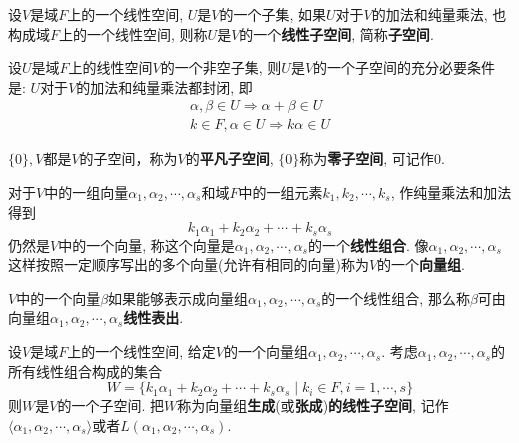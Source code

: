 \begin{Definition}[线性子空间]
设$V$是域$F$上的一个线性空间, $U$是$V$的一个\;\;子集, 如果$U$对于$V$的加法和纯量乘法, 也构成域$F$上的一个线性空间, 则称$U$是$V$的一个\textbf{线性子空间}, 简称\textbf{子空间}.
\end{Definition}

\begin{Theorem}[!!!]
设$U$是域$F$上的线性空间$V$的一个非空子集, 则$U$是$V$的一个子空间的充分必要条件是: $U$对于$V$的加法和纯量乘法都封闭, 即
$$
\begin{aligned}
\alpha, \beta \in U \Rightarrow \alpha + \beta \in U \\
k \in F, \alpha \in U \Rightarrow k \alpha \in U
\end{aligned}
$$
\end{Theorem}

\begin{Note}
$\{ 0 \}, V$都是$V$的子空间，称为$V$的\textbf{平凡子空间}, $\{ 0 \}$称为\textbf{零子空间}, 可记作$\mathfrak{0}$.
\end{Note}

\begin{Definition}
对于$V$中的一组向量$\alpha_1, \alpha_2, \cdots, \alpha_s$和域$F$中的一组元素$k_1, k_2, \cdots, k_s$, 作纯量乘法和加法得到
$$
k_1 \alpha_1 + k_2 \alpha_2 + \cdots +k_s \alpha_s
$$
仍然是$V$中的一个向量, 称这个向量是$\alpha_1, \alpha_2, \cdots, \alpha_s$的一个\textbf{线性组合}.
像$\alpha_1, \alpha_2, \cdots, \alpha_s$这样按照一定顺序写出的\;\;多个向量(允许有相同的向量)称为$V$的一个\textbf{向量组}.
\end{Definition}

\begin{Definition}[线性表出]
$V$中的一个向量$\beta$如果能够表示成向量组$\alpha_1, \alpha_2, \cdots, \alpha_s$的一个线性组合, 那么称$\beta$可由向量组$\alpha_1, \alpha_2, \cdots, \alpha_s$\textbf{线性表出}.
\end{Definition}

\begin{Definition}[由向量组生成的线性子空间]
设$V$是域$F$上的一个线性空间, 给定$V$的一个向量组$\alpha_1, \alpha_2, \cdots, \alpha_s$. 考虑$\alpha_1, \alpha_2, \cdots, \alpha_s$的所有线性组合构成的集合
$$
W = \{ k_1 \alpha_1 + k_2 \alpha_2 + \cdots + k_s \alpha_s \mid k_i \in F, i = 1, \cdots, s\}
$$
则$W$是$V$的一个子空间. 把$W$称为向量组\textbf{生成}(或\textbf{张成})\textbf{的线性子空间},
记作$\langle \alpha_1, \alpha_2, \cdots, \alpha_s \rangle$或者$L(\alpha_1, \alpha_2, \cdots, \alpha_s)$.
\end{Definition}

